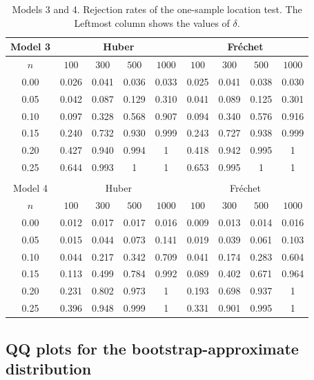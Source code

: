 \documentclass[preprint]{imsart}
\def\Frechet{Fr\'{e}chet}
\theoremstyle{plain}
\theoremstyle{remark}
\begin{document}
\begin{appendix}
\begin{table}[!t]
\centering
\caption{Models 3 and 4. Rejection rates of the one-sample location test. The Leftmost column shows the values of $\delta$. }
\label{tab:comparison3}
\begin{tabular}{c|cccc|cccc}
\hline
Model 3 & \multicolumn{4}{c|}{Huber} & \multicolumn{4}{c}{\Frechet} \\
\hline
$n$  & $100$& $300$ & $500$ & $1000 $
& $100$& $300$ & $500$ & $1000 $\\ \hline
        0.00  & 0.026 & 0.041 & 0.036 & 0.033 & 0.025 & 0.041 & 0.038 & 0.030 \\
        0.05  & 0.042 & 0.087 & 0.129 & 0.310 & 0.041 & 0.089 & 0.125 & 0.301 \\
        0.10  & 0.097 & 0.328 & 0.568 & 0.907 & 0.094 & 0.340 & 0.576 & 0.916 \\
        0.15  & 0.240 & 0.732 & 0.930 & 0.999 & 0.243 & 0.727 & 0.938 & 0.999 \\
        0.20  & 0.427 & 0.940 & 0.994 & 1 & 0.418 & 0.942 & 0.995 & 1 \\
        0.25  & 0.644 & 0.993 & 1 & 1 & 0.653 & 0.995 & 1 & 1 \\
\hline
\\
\hline
Model 4 & \multicolumn{4}{c|}{Huber} & \multicolumn{4}{c}{\Frechet} \\
\hline
$n$  & $100$& $300$ & $500$ & $1000 $
& $100$& $300$ & $500$ & $1000 $\\ \hline
        0.00  & 0.012 & 0.017 & 0.017 & 0.016 & 0.009 & 0.013 & 0.014 & 0.016 \\
        0.05  & 0.015 & 0.044 & 0.073 & 0.141 & 0.019 & 0.039 & 0.061 & 0.103 \\
        0.10  & 0.044 & 0.217 & 0.342 & 0.709 & 0.041 & 0.174 & 0.283 & 0.604 \\
        0.15  & 0.113 & 0.499 & 0.784 & 0.992 & 0.089 & 0.402 & 0.671 & 0.964 \\
        0.20  & 0.231 & 0.802 & 0.973 & 1 & 0.193 & 0.698 & 0.937 & 1 \\
        0.25  & 0.396 & 0.948 & 0.999 & 1 & 0.331 & 0.901 & 0.995 & 1 \\

\hline

\end{tabular}
\end{table}


\subsection{QQ plots for the bootstrap-approximate distribution}



\end{appendix}
\end{document}
